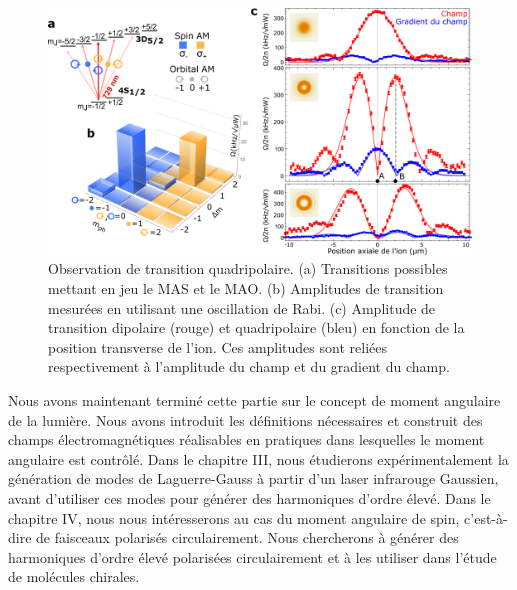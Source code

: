 \begin{figure}[!ht]
\centering
\includegraphics[width=0.9\columnwidth]{Figures/schmiegelow.png}
\caption{Observation de transition quadripolaire. (a) Transitions possibles mettant en jeu le MAS et le MAO. (b) Amplitudes de transition mesurées en utilisant une oscillation de Rabi. (c) Amplitude de transition dipolaire (rouge) et quadripolaire (bleu) en fonction de la position transverse de l'ion. Ces amplitudes sont reliées respectivement à l'amplitude du champ et du gradient du champ.}
\label{Fig:Schmiegelow}
\end{figure}


Nous avons maintenant terminé cette partie sur le concept de moment angulaire de la lumière. Nous avons introduit les définitions nécessaires et construit des champs électromagnétiques réalisables en pratiques dans lesquelles le moment angulaire est contrôlé. Dans le chapitre III, nous étudierons expérimentalement la génération de modes de Laguerre-Gauss à partir d'un laser infrarouge Gaussien, avant d'utiliser ces modes pour générer des harmoniques d'ordre élevé. Dans le chapitre IV, nous nous intéresserons au cas du moment angulaire de spin, c'est-à-dire de faisceaux polarisés circulairement. Nous chercherons à générer des harmoniques d'ordre élevé polarisées circulairement et à les utiliser dans l'étude de molécules chirales.